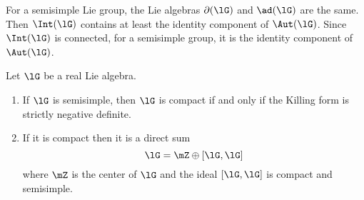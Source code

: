 For a semisimple Lie group, the Lie algebras $\partial(\lG)$ and $\ad(\lG)$ are the same. Then $\Int(\lG)$ contains at least the identity component of $\Aut(\lG)$. Since $\Int(\lG)$ is connected, for a semisimple group, it is the identity component of $\Aut(\lG)$.

\begin{proposition}     \label{ProplGcompactKillNeg}\label{prop:compact_Killing}
	Let $\lG$ be a real Lie algebra.
	\begin{enumerate}
		\item If $\lG$ is semisimple, then $\lG$ is compact if and only if  the Killing form is strictly negative definite.
		\item If it is compact then it is a direct sum
		      \begin{equation}
			      \lG=\mZ\oplus [\lG,\lG]
		      \end{equation}
		      where $\mZ$ is the center of $\lG$ and the ideal $[\lG,\lG]$ is compact and semisimple.
	\end{enumerate}
\end{proposition}

